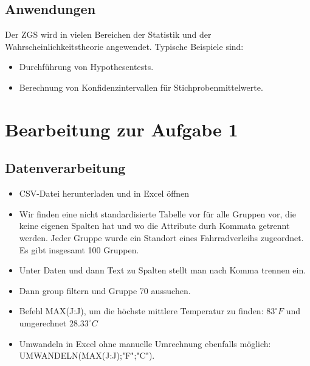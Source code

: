\documentclass{article}
\begin{document}
\subsection{Anwendungen}
Der ZGS wird in vielen Bereichen der Statistik und der Wahrscheinlichkeitstheorie angewendet. Typische Beispiele sind:
\begin{itemize}
    \item Durchführung von Hypothesentests.
    \item Berechnung von Konfidenzintervallen für Stichprobenmittelwerte.
\end{itemize}



\newpage
\section{Bearbeitung zur Aufgabe 1}
\subsection{Datenverarbeitung}
\begin{itemize}
    \item CSV-Datei herunterladen und in Excel öffnen
    \item Wir finden eine nicht standardisierte Tabelle vor für alle Gruppen vor, die keine eigenen Spalten hat und wo die Attribute durh Kommata getrennt werden. Jeder Gruppe wurde ein Standort eines Fahrradverleihs zugeordnet. Es gibt insgesamt 100 Gruppen.
    \item Unter \glqq Daten\grqq{} und dann \glqq Text zu Spalten\grqq{} stellt man nach Komma trennen ein.
    \item Dann \glqq group\grqq{} filtern und Gruppe 70 aussuchen.
    \item Befehl \glqq MAX(J:J)\grqq, um die höchste mittlere Temperatur zu finden: ${83}^\circ F$ und umgerechnet ${28.33}^\circ C$
    \item Umwandeln in Excel ohne manuelle Umrechnung ebenfalls möglich: \\UMWANDELN(MAX(J:J);"F";"C").
\end{itemize}
\newpage
\end{document}
